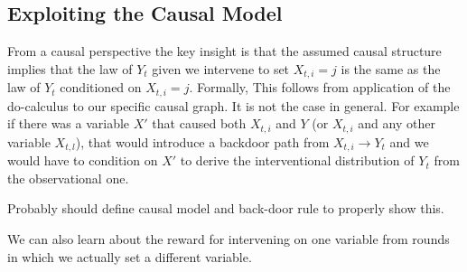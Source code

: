 
\subsection{Exploiting the Causal Model}


From a causal perspective the key insight is that the assumed causal structure implies that
the law of $Y_t$ given we intervene to set $X_{t,i} = j$ is the same as the law of $Y_t$ conditioned
on $X_{t,i} = j$. Formally,
This follows from application of the do-calculus \cite{Pearl2000} to our specific causal graph. It is not the case in general. 
For example if there was a variable $X'$ that caused both $X_{t,i}$ and $Y$ (or $X_{t,i}$ and any other variable $X_{t,l}$), 
that would introduce a backdoor path from $X_{t,i} \rightarrow Y_t$ and we would have to condition on $X'$ to derive the 
interventional distribution of $Y_t$ from the observational one.

\color{red} Probably should define causal model and back-door rule to properly show this.\color{black}

We can also learn about the reward for intervening on one variable from rounds in which we actually set a different variable.



